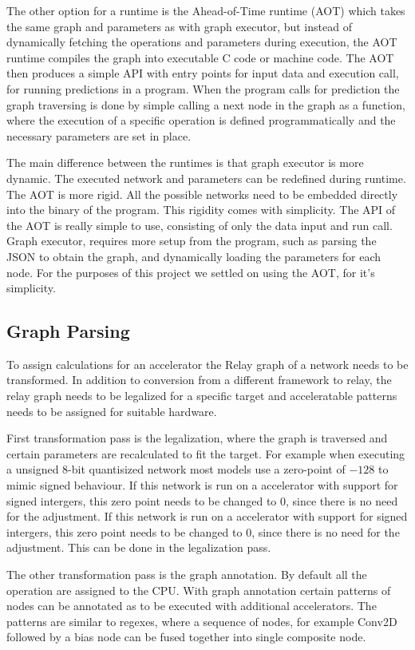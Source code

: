\documentclass[12pt,a4paper,english
]{tunithesis}
\begin{document}
The other option for a runtime is the Ahead-of-Time runtime (AOT) which takes the same graph and parameters as with graph executor, but instead of dynamically fetching the operations and parameters during execution, the AOT runtime compiles the graph into executable C code or machine code. The AOT then produces a simple API with entry points for input data and execution call, for running predictions in a program. When the program calls for prediction the graph traversing is done by simple calling a next node in the graph as a function, where the execution of a specific operation is defined programmatically and the necessary parameters are set in place.

The main difference between the runtimes is that graph executor is more dynamic. The executed network and parameters can be redefined during runtime. The AOT is more rigid. All the possible networks need to be embedded directly into the binary of the program. This rigidity comes with simplicity. The API of the AOT is really simple to use, consisting of only the data input and run call. Graph executor, requires more setup from the program, such as parsing the JSON to obtain the graph, and dynamically loading the parameters for each node. For the purposes of this project we settled on using the AOT, for it's simplicity.

\subsection{Graph Parsing}
To assign calculations for an accelerator the Relay graph of a network needs to be transformed. In addition to conversion from a different framework to relay, the relay graph needs to be legalized for a specific target and acceleratable patterns needs to be assigned for suitable hardware.

First transformation pass is the legalization, where the graph is traversed and certain parameters are recalculated to fit the target. For example when executing a unsigned 8-bit quantisized network most models use a zero-point of $-128$ to mimic signed behaviour. If this network is run on a accelerator with support for signed intergers, this zero point needs to be changed to 0, since there is no need for the adjustment. If this network is run on a accelerator with support for signed intergers, this zero point needs to be changed to 0, since there is no need for the adjustment. This can be done in the legalization pass.

The other transformation pass is the graph annotation. By default all the operation are assigned to the CPU. With graph annotation certain patterns of nodes can be annotated as to be executed with additional accelerators. The patterns are similar to regexes, where a sequence of nodes, for example Conv2D followed by a bias node can be fused together into single composite node.
\end{document}
